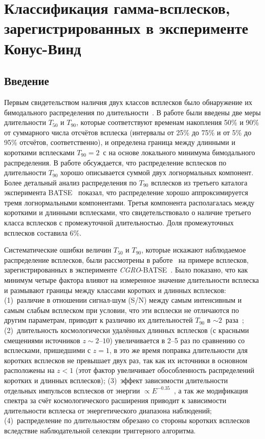 \chapter{Классификация гамма-всплесков, зарегистрированных в эксперименте Конус-Винд}\label{KW_GRB_classification}

\section{Введение}
Первым свидетельством наличия двух классов всплесков было обнаружение их бимодального 
распределения по длительности~\citep{Mazets_1981_part_1,Norris_1984,Kouveliotou_1993,Aptekar_1998}. 
В работе \citep{Kouveliotou_1993} были введены две меры длительности $T_{50}$ и $T_{90}$, 
которые соответствуют временам накопления 50\% и 90\% от суммарного числа отсчётов 
всплеска (интервалы от 25\% до 75\% и от 5\% до 95\% отсчётов, соответственно), 
и определена граница между длинными и короткими всплесками $T_{90}=2$~с 
на основе локального минимума бимодального распределения. 
В работе \citep{McBreen_1994} обсуждается, что распределение всплесков по 
длительности $T_{90}$ хорошо описывается суммой двух логнормальных компонент. 
Более детальный анализ распределения по $T_{90}$ всплесков из третьего каталога 
эксперимента BATSE~\citep{Horvath_2002} показал, что распределение 
хорошо аппроксимируется тремя логнормальными компонентами. 
Третья компонента располагалась между короткими и длинными всплесками, 
что свидетельствовало о наличие третьего класса всплесков с промежуточной длительностью.
Доля промежуточных всплесков составила 6\%. 

Систематические ошибки величин $T_{50}$ и $T_{90}$, которые искажают наблюдаемое 
распределение всплесков, были рассмотрены в работе~\citep{Norris_and_Bonnel_2006ApJ} 
на примере всплесков, зарегистрированных в эксперименте \textit{CGRO}-BATSE~\citep{Fishman_1992NASCP3137}. 
Было показано, что как минимум четыре фактора влияют на измеренное значение длительности 
всплеска и размывают границы между классами коротких и длинных всплесков: 
(1)~различие в отношении сигнал-шум (S/N) между самым интенсивным и самым слабым 
всплеском  при условии, что эти всплески не отличаются по другим параметрам, 
приводит к различию их длительностей $T_{90}$ в $\sim 2$~раза~\citep{Bonnell_1997}; 
(2)~длительность космологически удалённых длинных всплесков (с красными смещениями источников 
$z \sim 2 \textrm{--}10$) увеличивается в 2--5 раз по сравнению со всплесками, 
пришедшими с $z=1$, в это же время поправка длительности 
для коротких всплесков не превышает двух раз, так как их источники в основном 
расположены на $z<1$ (этот фактор увеличивает обособленность распределений 
коротких и длинных всплесков); (3)~эффект зависимости длительности отдельных импульсов 
всплесков от энергии $\propto E^{-0.35}$~\citep{Fenimore_1995}, а так же модификация 
спектра за счёт космологического расширения приводит к зависимости длительности 
всплеска от энергетического диапазона наблюдений; (4)~распределение по длительностям 
обрезано со стороны коротких всплесков вследствие наблюдательной селекции триггерного 
алгоритма. 

